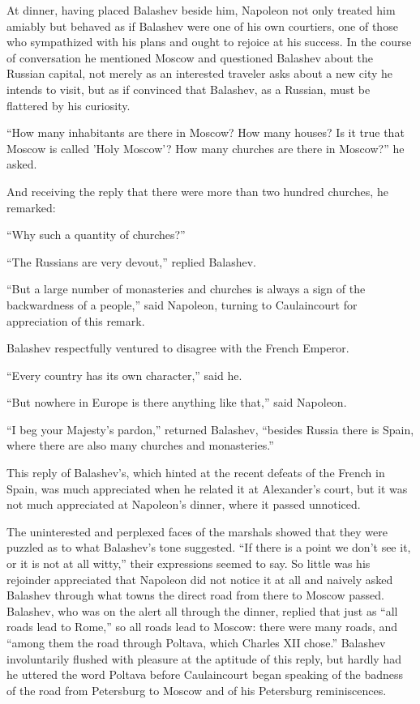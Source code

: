 At dinner, having placed Balashev beside him, Napoleon not only
treated him amiably but behaved as if Balashev were one of his
own courtiers, one of those who sympathized with his plans and
ought to rejoice at his success. In the course of conversation he
mentioned Moscow and questioned Balashev about the Russian
capital, not merely as an interested traveler asks about a new
city he intends to visit, but as if convinced that Balashev, as a
Russian, must be flattered by his curiosity.

``How many inhabitants are there in Moscow? How many houses? Is
it true that Moscow is called 'Holy Moscow'? How many churches
are there in Moscow?'' he asked.

And receiving the reply that there were more than two hundred
churches, he remarked:

``Why such a quantity of churches?''

``The Russians are very devout,'' replied Balashev.

``But a large number of monasteries and churches is always a sign
of the backwardness of a people,'' said Napoleon, turning to
Caulaincourt for appreciation of this remark.

Balashev respectfully ventured to disagree with the French
Emperor.

``Every country has its own character,'' said he.

``But nowhere in Europe is there anything like that,'' said
Napoleon.

``I beg your Majesty's pardon,'' returned Balashev, ``besides
Russia there is Spain, where there are also many churches and
monasteries.''

This reply of Balashev's, which hinted at the recent defeats of
the French in Spain, was much appreciated when he related it at
Alexander's court, but it was not much appreciated at Napoleon's
dinner, where it passed unnoticed.

The uninterested and perplexed faces of the marshals showed that
they were puzzled as to what Balashev's tone suggested. ``If
there is a point we don't see it, or it is not at all witty,''
their expressions seemed to say. So little was his rejoinder
appreciated that Napoleon did not notice it at all and naively
asked Balashev through what towns the direct road from there to
Moscow passed. Balashev, who was on the alert all through the
dinner, replied that just as ``all roads lead to Rome,'' so all
roads lead to Moscow: there were many roads, and ``among them the
road through Poltava, which Charles XII chose.'' Balashev
involuntarily flushed with pleasure at the aptitude of this
reply, but hardly had he uttered the word Poltava before
Caulaincourt began speaking of the badness of the road from
Petersburg to Moscow and of his Petersburg reminiscences.


